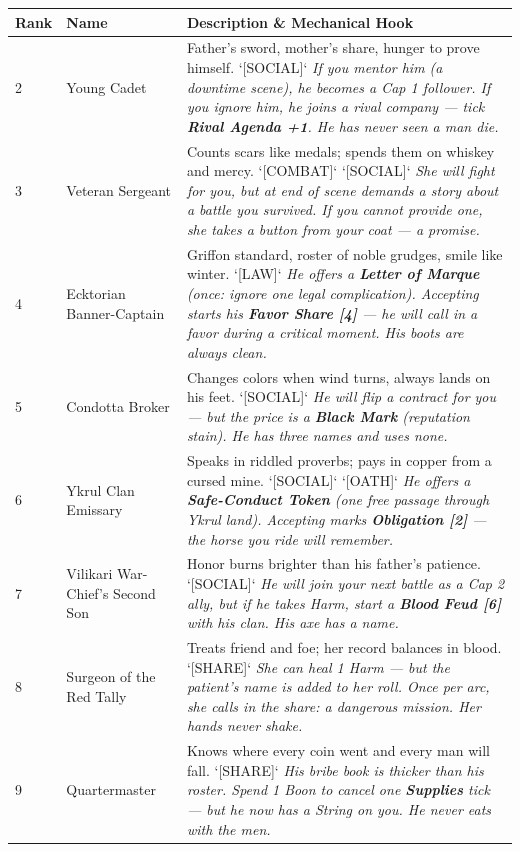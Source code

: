 \begin{longtable}{|p{}|p{}|p{}|}
\hline
\textbf{Rank} & \textbf{Name} & \textbf{Description \& Mechanical Hook} \\
\hline
2 & Young Cadet & Father's sword, mother's share, hunger to prove himself. `[SOCIAL]` \textit{If you mentor him (a downtime scene), he becomes a Cap 1 follower. If you ignore him, he joins a rival company --- tick \textbf{Rival Agenda +1}. He has never seen a man die.} \\
\hline
3 & Veteran Sergeant & Counts scars like medals; spends them on whiskey and mercy. `[COMBAT]` `[SOCIAL]` \textit{She will fight for you, but at end of scene demands a story about a battle you survived. If you cannot provide one, she takes a button from your coat --- a promise.} \\
\hline
4 & Ecktorian Banner-Captain & Griffon standard, roster of noble grudges, smile like winter. `[LAW]` \textit{He offers a \textbf{Letter of Marque} (once: ignore one legal complication). Accepting starts his \textbf{Favor Share [4]} --- he will call in a favor during a critical moment. His boots are always clean.} \\
\hline
5 & Condotta Broker & Changes colors when wind turns, always lands on his feet. `[SOCIAL]` \textit{He will flip a contract for you --- but the price is a \textbf{Black Mark} (reputation stain). He has three names and uses none.} \\
\hline
6 & Ykrul Clan Emissary & Speaks in riddled proverbs; pays in copper from a cursed mine. `[SOCIAL]` `[OATH]` \textit{He offers a \textbf{Safe-Conduct Token} (one free passage through Ykrul land). Accepting marks \textbf{Obligation [2]} --- the horse you ride will remember.} \\
\hline
7 & Vilikari War-Chief's Second Son & Honor burns brighter than his father's patience. `[SOCIAL]` \textit{He will join your next battle as a Cap 2 ally, but if he takes Harm, start a \textbf{Blood Feud [6]} with his clan. His axe has a name.} \\
\hline
8 & Surgeon of the Red Tally & Treats friend and foe; her record balances in blood. `[SHARE]` \textit{She can heal 1 Harm --- but the patient's name is added to her roll. Once per arc, she calls in the share: a dangerous mission. Her hands never shake.} \\
\hline
9 & Quartermaster & Knows where every coin went and every man will fall. `[SHARE]` \textit{His bribe book is thicker than his roster. Spend 1 Boon to cancel one \textbf{Supplies} tick --- but he now has a String on you. He never eats with the men.} \\

\end{longtable}
